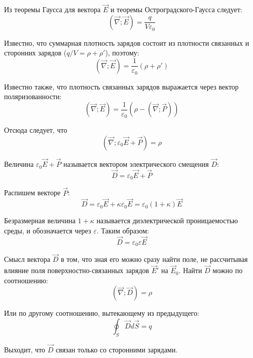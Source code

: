 \documentclass{article}
\begin{document}
	Из теоремы Гаусса для вектора $\vec E$ и теоремы Остроградского-Гаусса следует:
	\begin{equation}
		(\vec\nabla;\vec E) = \frac{q}{V\varepsilon_0}
	\end{equation}

	Известно, что суммарная плотность зарядов состоит из плотности связанных и сторонних зарядов ($q/V = \rho + \rho'$), поэтому:
	\begin{equation}
		(\vec\nabla;\vec E) = \frac{1}{\varepsilon_0}(\rho+\rho')
	\end{equation}

	Известно также, что плотность связанных зарядов выражается через вектор поляризованности:
	\begin{equation}
		(\vec\nabla;\vec E) = \frac{1}{\varepsilon_0}(\rho-(\vec\nabla;\vec P))
	\end{equation}

	Отсюда следует, что
	\begin{equation}
		(\vec\nabla;\varepsilon_0\vec E + \vec P) = \rho
	\end{equation}

	Величина $\varepsilon_0\vec E + \vec P$ называется вектором электрического смещения $\vec D$:
	\begin{equation}
		\vec D = \varepsilon_0\vec E + \vec P
	\end{equation}

	Распишем векторе $\vec P$:
	\begin{equation}
		\vec D = \varepsilon_0\vec E + \kappa\varepsilon_0\vec E = \varepsilon_0(1+\kappa)\vec E
	\end{equation}

	Безразмерная величина $1+\kappa$ называется диэлектрической проницаемостью среды, и обозначается через $\varepsilon$. Таким образом:
	\begin{equation}
		\vec D = \varepsilon_0\varepsilon\vec E
	\end{equation}

	Смысл вектора $\vec D$ в том, что зная его можно сразу найти поле, не рассчитывая влияние поля поверхностно-связанных зарядов $\vec E'$ на $\vec E_0$. Найти $\vec D$ можно по соотношению:
	\begin{equation}
		(\vec\nabla;\vec D) = \rho
	\end{equation}

	Или по другому соотношению, вытекающему из предыдущего:
	\begin{equation}
		\oint_S \vec D d\vec S = q
	\end{equation}

	Выходит, что $\vec D$ связан только со сторонними зарядами.
\end{document}
